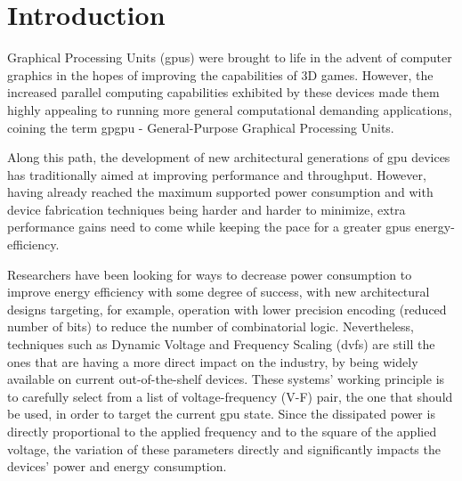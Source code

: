 
\chapter{Introduction}
\label{chapter:introduction}

Graphical Processing Units (\acrshort{gpu}s) were brought to life in the advent of computer graphics in the hopes of improving the capabilities of 3D games. However, the increased parallel computing capabilities exhibited by these devices made them highly appealing to running more general computational demanding applications, coining the term \acrshort{gpgpu} - General-Purpose Graphical Processing Units.

Along this path, the development of new architectural generations of \acrshort{gpu} devices has traditionally aimed at improving performance and throughput. However, having already reached the maximum supported power consumption and with device fabrication techniques being harder and harder to minimize, extra performance gains need to come while keeping the pace for a greater \acrshort{gpu}s energy-efficiency.

Researchers have been looking for ways to decrease power consumption to improve energy efficiency with some degree of success, with new architectural designs targeting, for example, operation with lower precision encoding (reduced number of bits) to reduce the number of combinatorial logic. Nevertheless, techniques such as Dynamic Voltage and Frequency Scaling (\acrshort{dvfs}) are still the ones that are having a more direct impact on the industry, by being widely available on current out-of-the-shelf devices. These systems' working principle is to carefully select from a list of voltage-frequency (V-F) pair, the one that should be used, in order to target the current \acrshort{gpu} state. Since the dissipated power is directly proportional to the applied frequency and to the square of the applied voltage, the variation of these parameters directly and significantly impacts the devices' power and energy consumption.

